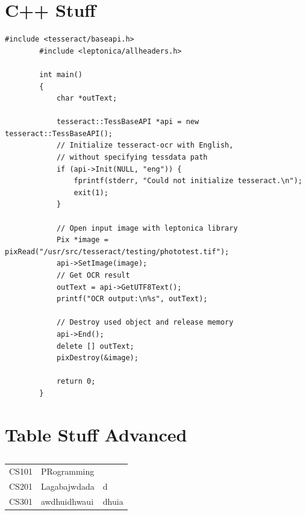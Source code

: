 \documentclass[11pt]{article}
\begin{document}
    \section{C++ Stuff}
    \begin{lstlisting}[label={lst:lstlisting}]
        #include <tesseract/baseapi.h>
        #include <leptonica/allheaders.h>

        int main()
        {
            char *outText;

            tesseract::TessBaseAPI *api = new tesseract::TessBaseAPI();
            // Initialize tesseract-ocr with English,
            // without specifying tessdata path
            if (api->Init(NULL, "eng")) {
                fprintf(stderr, "Could not initialize tesseract.\n");
                exit(1);
            }

            // Open input image with leptonica library
            Pix *image = pixRead("/usr/src/tesseract/testing/phototest.tif");
            api->SetImage(image);
            // Get OCR result
            outText = api->GetUTF8Text();
            printf("OCR output:\n%s", outText);

            // Destroy used object and release memory
            api->End();
            delete [] outText;
            pixDestroy(&image);

            return 0;
        }
    \end{lstlisting}

    \section{Table Stuff Advanced}

    \begin{table}
        \caption{}
        \begin{center}
            \begin{tabular}{|l|l|p{3cm}|}
                \hline
                CS101 & PRogramming   & \\
                CS201 & Lagabajwdada  & d \\
                CS301 & awdhuidhwaui  & dhuia\\
                \hline
            \end{tabular}
            \label{table_improved}
        \end{center}
    \end{table}
\end{document}
